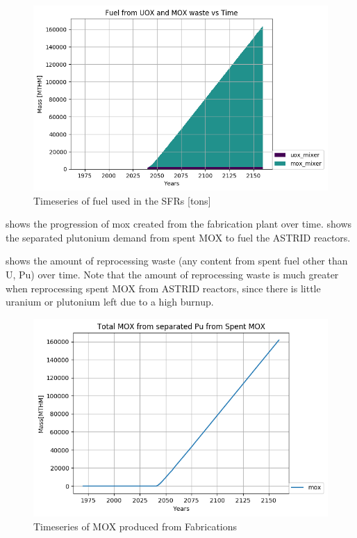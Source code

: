\begin{figure}[htbp!]
	\begin{center}
		\includegraphics[width=\columnwidth]{./images/french-transition/where_fuel.png}
	\end{center}
	\caption{Timeseries of fuel used in the \gls{SFR}s [tons]}
	\label{fig:fuel}
\end{figure}

 shows the progression of mox created from
the fabrication plant over time.  shows
the separated plutonium demand from spent \gls{MOX} to fuel the 
ASTRID reactors.

 shows the amount of reprocessing waste
(any content from spent fuel other than U, Pu) over time. Note that 
the amount of reprocessing waste is much greater when reprocessing
spent \gls{MOX} from ASTRID reactors, since there is little uranium
or plutonium left due to a high burnup.

\begin{figure}[htbp!]
	\begin{center}
		\includegraphics[width=\columnwidth]{./images/french-transition/mox_from_mixer.png}
	\end{center}
	\caption{Timeseries of MOX produced from Fabrications}
	\label{fig:mox_fab}
\end{figure}


